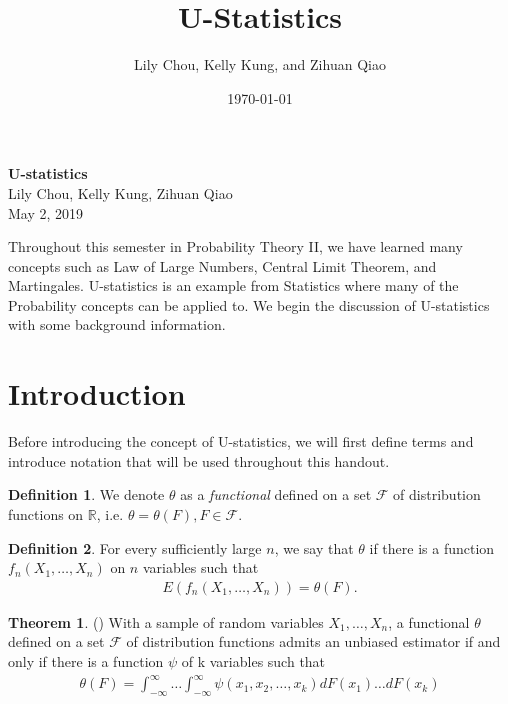 \documentclass{article}
\title{U-Statistics}
\author{Lily Chou, Kelly Kung, and Zihuan Qiao}
\date{\today}
\newcommand{\R}{{\mathbb{R}}}
\theoremstyle{definition}
\newtheorem{theorem}{Theorem}
\newtheorem{Def}{Definition}
\numberwithin{Def}{section}
\begin{document}
\thispagestyle{empty}

\begin{center}
{\LARGE \bf U-statistics}\\
{\large Lily Chou, Kelly Kung, Zihuan Qiao}\\
May 2, 2019
\end{center}

Throughout this semester in Probability Theory II, we have learned many concepts such as Law of Large Numbers, Central Limit Theorem, and Martingales. U-statistics is an example from Statistics where many of the Probability concepts can be applied to. We begin the discussion of U-statistics with some background information.

\section{Introduction}
Before introducing the concept of U-statistics, we will first define terms and introduce notation that will be used throughout this handout. 
\begin{Def}{}
We denote $\theta$ as a \textit{functional} defined on a set $\mathcal{F}$ of distribution functions on $\R$, i.e. $\theta = \theta(F), F \in \mathcal{F}$.
\end{Def}

\begin{Def}{}
For every sufficiently large $n$, we say that $\theta$  if there is a function $f_n(X_1, \dotsc, X_n)$ on $n$ variables such that \begin{align}\label{unbiased} E(f_n(X_1, \dotsc, X_n)) = \theta(F).\end{align}
\end{Def}


\begin{theorem}
(\cite{halmos1946theory}) With a sample of random variables $X_1, \dotsc, X_n$, a functional $\theta$ defined on a set $\mathcal{F}$ of distribution functions admits an unbiased estimator if and only if there is a function $\psi$ of k variables such that 
\begin{align}\label{unbiased_est}
    \theta(F) = \int_{-\infty}^{\infty} \dotsc \int_{-\infty}^{\infty} \psi(x_1, x_2, \dotsc, x_k)dF(x_1) \dotsc dF(x_k)
\end{align}
\end{theorem}
\end{document}
